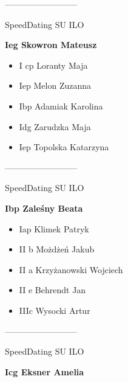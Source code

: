 \documentclass[a4paper,10pt]{article}
\begin{document}
\begin{multicols}{3}
\begin{minipage}[l]{\textwidth}
\begin{itemize}
    \end{itemize}



\end{minipage}



\begin{minipage}[l]{\textwidth}
--------------------------

  \footnotesize{SpeedDating SU ILO}

  \bfseries{Ieg Skowron Mateusz}

  \begin{itemize}
    \item I cp Loranty Maja
    \item Iep Melon Zuzanna
    \item Ibp Adamiak Karolina
    \item Idg Zarudzka Maja
    \item Iep Topolska Katarzyna

    \end{itemize}



\end{minipage}



\begin{minipage}[l]{\textwidth}
--------------------------

  \footnotesize{SpeedDating SU ILO}

  \bfseries{Ibp Zaleśny Beata}

  \begin{itemize}
    \item Iap Klimek Patryk
    \item II b Możdżeń Jakub
    \item II a Krzyżanowski Wojciech
    \item II e Behrendt Jan
    \item IIIc Wysocki Artur

    \end{itemize}



\end{minipage}



\begin{minipage}[l]{\textwidth}
--------------------------

  \footnotesize{SpeedDating SU ILO}

  \bfseries{Icg Eksner Amelia}


\end{minipage}
\end{multicols}
\end{document}
